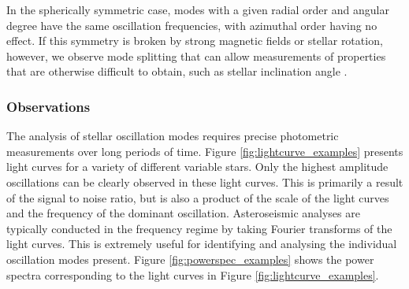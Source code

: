 In the spherically symmetric case, modes with a given radial order and angular degree have the same oscillation frequencies, with azimuthal order having no effect. If this symmetry is broken by strong magnetic fields or stellar rotation, however, we observe mode splitting that can allow measurements of properties that are otherwise difficult to obtain, such as stellar inclination angle \citep{corsaro_spin_2017}. %

\subsubsection{Observations}

The analysis of stellar oscillation modes requires precise photometric measurements over long periods of time. Figure \ref{fig:lightcurve_examples} presents light curves for a variety of different variable stars. Only the highest amplitude oscillations can be clearly observed in these light curves. This is primarily a result of the signal to noise ratio, but is also a product of the scale of the light curves and the frequency of the dominant oscillation. Asteroseismic analyses are typically conducted in the frequency regime by taking Fourier transforms of the light curves. This is extremely useful for identifying and analysing the individual oscillation modes present. Figure \ref{fig:powerspec_examples} shows the power spectra corresponding to the light curves in Figure \ref{fig:lightcurve_examples}.

